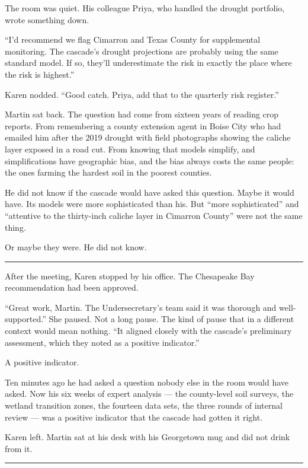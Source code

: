 \documentclass[11pt]{article}
\begin{document}
The room was quiet. His colleague Priya, who handled the drought portfolio, wrote something down.

``I'd recommend we flag Cimarron and Texas County for supplemental monitoring. The cascade's drought projections are probably using the same standard model. If so, they'll underestimate the risk in exactly the place where the risk is highest.''

Karen nodded. ``Good catch. Priya, add that to the quarterly risk register.''

Martin sat back. The question had come from sixteen years of reading crop reports. From remembering a county extension agent in Boise City who had emailed him after the 2019 drought with field photographs showing the caliche layer exposed in a road cut. From knowing that models simplify, and simplifications have geographic bias, and the bias always costs the same people: the ones farming the hardest soil in the poorest counties.

He did not know if the cascade would have asked this question. Maybe it would have. Its models were more sophisticated than his. But ``more sophisticated'' and ``attentive to the thirty-inch caliche layer in Cimarron County'' were not the same thing.

Or maybe they were. He did not know.

\begin{center}\rule{0.3\linewidth}{0.4pt}\end{center}

After the meeting, Karen stopped by his office. The Chesapeake Bay recommendation had been approved.

``Great work, Martin. The Undersecretary's team said it was thorough and well-supported.'' She paused. Not a long pause. The kind of pause that in a different context would mean nothing. ``It aligned closely with the cascade's preliminary assessment, which they noted as a positive indicator.''

A positive indicator.

Ten minutes ago he had asked a question nobody else in the room would have asked. Now his six weeks of expert analysis --- the county-level soil surveys, the wetland transition zones, the fourteen data sets, the three rounds of internal review --- was a positive indicator that the cascade had gotten it right.

Karen left. Martin sat at his desk with his Georgetown mug and did not drink from it.

\begin{center}\rule{0.3\linewidth}{0.4pt}\end{center}
\end{document}
